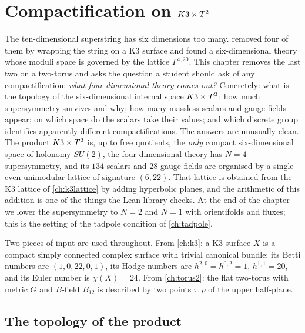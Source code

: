 \chapter{Compactification on \texorpdfstring{$K3\times T^2$}{K3 x T2}}\label{ch:k3t2}

The ten-dimensional superstring has six dimensions too many.  removed four
of them by wrapping the string on a K3 surface and found a six-dimensional theory whose moduli
space is governed by the lattice $\Gamma^{4,20}$. This chapter removes the last two on a
two-torus and asks the question a student should ask of any compactification: \emph{what
four-dimensional theory comes out?} Concretely: what is the topology of the six-dimensional
internal space $K3\times T^2$; how much supersymmetry survives and why; how many massless scalars and
gauge fields appear; on which space do the scalars take their values; and which discrete group
identifies apparently different compactifications. The answers are unusually clean. The
product $K3\times T^2$ is, up to free quotients, the \emph{only} compact six-dimensional space of
holonomy $SU(2)$, the four-dimensional theory has $N=4$ supersymmetry, and its $134$ scalars
and $28$ gauge fields are organised by a single even unimodular lattice of signature $(6,22)$.
That lattice is obtained from the K3 lattice of \cref{ch:k3lattice} by adding hyperbolic planes,
and the arithmetic of this addition is one of the things the Lean library checks. At the end
of the chapter we lower the supersymmetry to $N=2$ and $N=1$ with orientifolds and fluxes; this
is the setting of the tadpole condition of \cref{ch:tadpole}.

Two pieces of input are used throughout. From \cref{ch:k3}: a K3 surface $X$ is a compact
simply connected complex surface with trivial canonical bundle; its Betti numbers are
$(1,0,22,0,1)$, its Hodge numbers are $h^{2,0}=h^{0,2}=1$, $h^{1,1}=20$, and its Euler number
is $\chi(X)=24$. From \cref{ch:torus2}: the flat two-torus with metric $G$ and $B$-field
$B_{12}$ is described by two points $\tau,\rho$ of the upper half-plane.

\section{The topology of the product}\label{sec:k3t2:topology}

